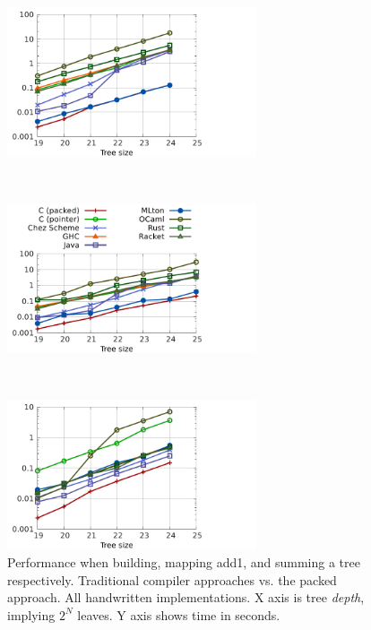 \documentclass[a4paper,english]{lipics-v2016}
\begin{document}
\begin{figure}[t]
  \vspace{-7mm}
\begin{minipage}{1.04\textwidth}
  \begin{minipage}{.32\textwidth}
    \centering
    \includegraphics[width=2.9in]{./figs/shootout_buildtree.pdf}    
  \end{minipage}
  $ $ 
  \begin{minipage}{.32\textwidth}
    \hspace{-4mm}
    \hspace{2mm}
    \includegraphics[width=2.9in]{./figs/shootout_add1.pdf}
  \end{minipage}
  $ $
  \begin{minipage}{.32\textwidth}
    \centering
        \includegraphics[width=2.9in]{./figs/shootout_sumtree.pdf}
  \end{minipage}

\end{minipage}
  \vspace{-3mm}
  \caption{Performance when building, mapping add1, and summing a tree respectively.
    Traditional compiler approaches vs. the packed approach.  All handwritten
    implementations.  X axis is tree {\em depth}, implying $2^N$ leaves.  Y axis
  shows time in seconds.}
  \label{fig:shootout1}
\end{figure}
\end{document}
